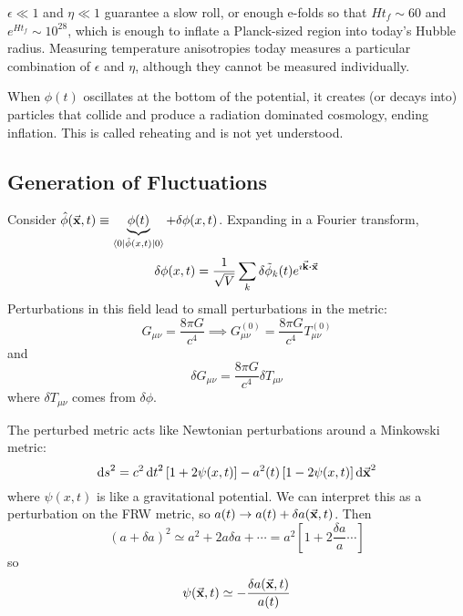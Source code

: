 \documentclass[a4paper,twoside,master.tex]{subfiles}
\begin{document}

$ \epsilon \ll 1 $ and $ \eta \ll 1 $ guarantee a slow roll, or enough e-folds so that $ H t_f \sim 60 $ and $ e^{H t_f} \sim 10^{28} $, which is enough to inflate a Planck-sized region into today's Hubble radius. Measuring temperature anisotropies today measures a particular combination of $ \epsilon $ and $ \eta $, although they cannot be measured individually.

When $ \phi(t) $ oscillates at the bottom of the potential, it creates (or decays into) particles that collide and produce a radiation dominated cosmology, ending inflation. This is called reheating and is not yet understood.

\subsection{Generation of Fluctuations}\label{sub:generation_of_fluctuations}

Consider $ \hat{\phi}(\va{x}, t) \equiv \underbrace{\phi(t)}_{\mel{0}{\hat{\phi}(x,t)}{0}} + \delta \phi(x,t) $. Expanding in a Fourier transform,
\begin{equation}
    \delta \phi(x,t) = \frac{1}{\sqrt{V}} \sum_k \delta \tilde{\phi}_k(t) e^{\imath \va{k} \vdot \va{x}}
\end{equation}
Perturbations in this field lead to small perturbations in the metric:
\begin{equation}
    G_{\mu \nu} = \frac{8 \pi G}{c^4} \implies G_{\mu \nu}^{(0)} = \frac{8 \pi G}{c^4} T_{\mu \nu}^{(0)}
\end{equation}
and
\begin{equation}
    \delta G_{\mu \nu} = \frac{8 \pi G}{c^4} \delta T_{\mu \nu}
\end{equation}
where $ \delta T_{\mu \nu} $ comes from $ \delta \phi $.

The perturbed metric acts like Newtonian perturbations around a Minkowski metric:
\begin{equation}
    \dd{s}^2 = c^2 \dd{t}^2 \left[ 1 + 2 \psi(x,t) \right] - a^2(t) \left[ 1 - 2 \psi(x, t) \right] \dd{\va{x}}^2 
\end{equation}
where $ \psi(x,t) $ is like a gravitational potential. We can interpret this as a perturbation on the FRW metric, so $ a(t) \to a(t) + \delta a(\va{x}, t) $. Then
\begin{equation}
    (a + \delta a)^2 \simeq a^2 + 2 a \delta a + \cdots = a^2 \left[ 1 + 2 \frac{\delta a}{a} \cdots \right]
\end{equation}
so
\begin{equation}
    \psi(\va{x}, t) \simeq - \frac{\delta a(\va{x},t)}{a(t)}
\end{equation}
\end{document}
